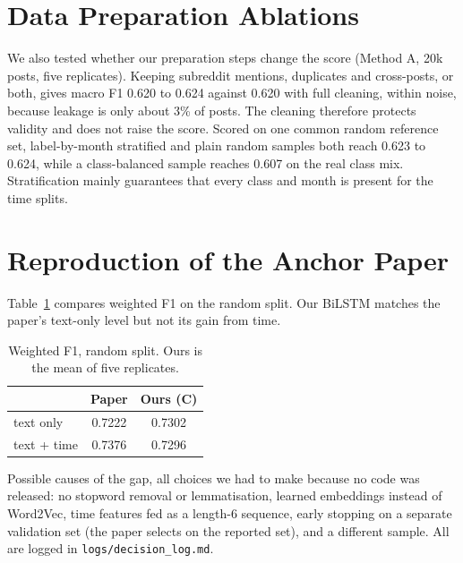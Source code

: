 \documentclass[10pt,twocolumn]{article}
\begin{document}
\section{Data Preparation Ablations}
We also tested whether our preparation steps change the score (Method A, 20k posts, five replicates). Keeping subreddit mentions, duplicates and cross-posts, or both, gives macro F1 0.620 to 0.624 against 0.620 with full cleaning, within noise, because leakage is only about 3\% of posts. The cleaning therefore protects validity and does not raise the score. Scored on one common random reference set, label-by-month stratified and plain random samples both reach 0.623 to 0.624, while a class-balanced sample reaches 0.607 on the real class mix. Stratification mainly guarantees that every class and month is present for the time splits.

\section{Reproduction of the Anchor Paper}
Table~\ref{tab:repro} compares weighted F1 on the random split. Our BiLSTM matches the paper's text-only level but not its gain from time.
\begin{table}[h]\centering\small
\begin{tabular}{lcc}\toprule & Paper & Ours (C) \\\midrule text only & 0.7222 & 0.7302 \\ text + time & 0.7376 & 0.7296 \\\bottomrule\end{tabular}
\caption{Weighted F1, random split. Ours is the mean of five replicates.}\label{tab:repro}
\end{table}
Possible causes of the gap, all choices we had to make because no code was released: no stopword removal or lemmatisation, learned embeddings instead of Word2Vec, time features fed as a length-6 sequence, early stopping on a separate validation set (the paper selects on the reported set), and a different sample. All are logged in \texttt{logs/decision\_log.md}.
\end{document}
